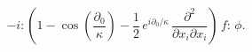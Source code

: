 \begin{equation}\label{36}
- i:\left( 1 -\cos\left(\frac{\partial_0}\kappa\right) - \frac12\,
e^{i\partial_0/\kappa}\, \frac{\partial^2}{\partial x_i\partial x_i}\right)\,
f:\, \phi.
\end{equation}

